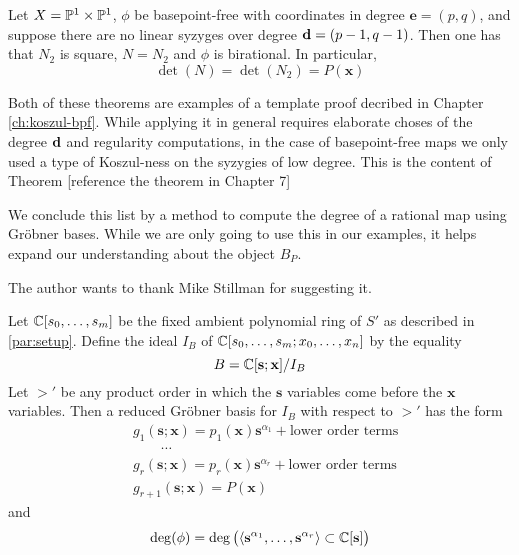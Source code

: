 \documentclass[fleqn,reqno]{amsart}
\numberwithin{first}{chapter}
\begin{document}
\begin{theorem}
\label{thm:rel-moving-quadrics}
Let $X=\mathbb{P}^1\times\mathbb{P}^1$, $\phi$ be basepoint-free with coordinates in degree $\mathbf e=(p,q)$,
and suppose there are no linear syzyges over degree $\mathbf d=(p-1,q-1)$.
Then one has that $N_2$ is square, $N=N_2$ and $\phi$ is birational. In particular,
\[
	\det(N)=\det(N_2)=P(\mathbf x)
\]
\end{theorem}

\begin{paragraf*}
Both of these theorems are examples of a template proof decribed in Chapter \ref{ch:koszul-bpf}.
While applying it in general requires elaborate choses of the degree $\mathbf d$ and
regularity computations, in the case of basepoint-free maps we only used a type
of Koszul-ness on the syzygies of low degree.
This is the content of Theorem [reference the theorem in Chapter 7]
\end{paragraf*}



\begin{paragraf*}
We conclude this list by a method to compute the degree of a rational map using Gr\"{o}bner bases.
While we are only going to use this in our examples,
it helps expand our understanding about the object $B_P$.

The author wants to thank Mike Stillman for suggesting it.
\end{paragraf*}

\begin{proposition}
\label{prop:deg-GB}
Let $\mathbb{C}[s_0,\ldots,s_m]$ be the fixed ambient polynomial ring of $S'$ as described in \ref{par:setup}.
Define the ideal $I_B$ of $\mathbb{C}[s_0,\ldots,s_m;x_0,\ldots,x_n]$ by the equality
\[
	B=\mathbb{C}[\mathbf s;\mathbf x]/I_B
\]
Let $>'$ be any product order in which the $\mathbf s$ variables
come before the $\mathbf x$ variables.
Then a reduced Gr\"obner basis for $I_B$ with respect to $>'$ has the form
\begin{align*}
	&g_1(\mathbf s;\mathbf x)=p_1(\mathbf x){\mathbf s}^{\alpha_1}+\text{lower order terms}\\
	&\qquad\cdots\\
	&g_r(\mathbf s;\mathbf x)=p_r(\mathbf x){\mathbf s}^{\alpha_r}+\text{lower order terms}\\
	&g_{r+1}(\mathbf s;\mathbf x)=P(\mathbf x)
\end{align*}
and
\[
	\deg(\phi)=\deg \big(\langle{\mathbf s}^{\alpha_1},\ldots,{\mathbf s}^{\alpha_r}\rangle\subset\mathbb{C}[\mathbf s]\big)
\]
\end{proposition}
\end{document}
